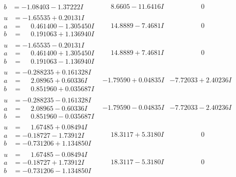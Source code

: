 \documentclass[1p]{elsarticle_modified}
\theoremstyle{definition}
\begin{document}
$$\begin{array}{c|c|c}
\begin{aligned}
b &= -1.08403 - 1.37222 I\end{aligned}
 & \phantom{-}8.6605 - 11.6416 I & \phantom{-0.000000 } 0 \\ \hline\begin{aligned}
u &= -1.65535 + 0.20131 I \\
a &= \phantom{-}0.461400 - 1.305450 I \\
b &= \phantom{-}0.191063 + 1.136940 I\end{aligned}
 & \phantom{-}14.8889 - 7.4681 I & \phantom{-0.000000 } 0 \\ \hline\begin{aligned}
u &= -1.65535 - 0.20131 I \\
a &= \phantom{-}0.461400 + 1.305450 I \\
b &= \phantom{-}0.191063 - 1.136940 I\end{aligned}
 & \phantom{-}14.8889 + 7.4681 I & \phantom{-0.000000 } 0 \\ \hline\begin{aligned}
u &= -0.288235 + 0.161328 I \\
a &= \phantom{-}2.08965 + 0.60336 I \\
b &= \phantom{-}0.851960 + 0.035687 I\end{aligned}
 & -1.79590 + 0.04835 I & -7.72033 + 2.40236 I \\ \hline\begin{aligned}
u &= -0.288235 - 0.161328 I \\
a &= \phantom{-}2.08965 - 0.60336 I \\
b &= \phantom{-}0.851960 - 0.035687 I\end{aligned}
 & -1.79590 - 0.04835 I & -7.72033 - 2.40236 I \\ \hline\begin{aligned}
u &= \phantom{-}1.67485 + 0.08494 I \\
a &= -0.18727 - 1.73912 I \\
b &= -0.731206 + 1.134850 I\end{aligned}
 & \phantom{-}18.3117 + 5.3180 I & \phantom{-0.000000 } 0 \\ \hline\begin{aligned}
u &= \phantom{-}1.67485 - 0.08494 I \\
a &= -0.18727 + 1.73912 I \\
b &= -0.731206 - 1.134850 I\end{aligned}
 & \phantom{-}18.3117 - 5.3180 I & \phantom{-0.000000 } 0 \\ \hline\begin{aligned}

\end{aligned}
\end{array}$$
\end{document}
